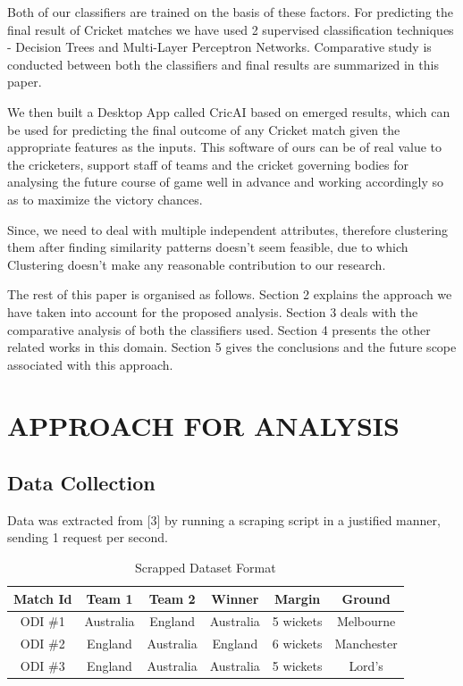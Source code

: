 \documentclass[a4paper, 10pt, conference]{IEEEtran}
\begin{document}
Both of our classifiers are trained on the basis of these factors. For predicting the final result of Cricket matches we have used 2 supervised classification techniques - Decision Trees and Multi-Layer Perceptron Networks. Comparative study is conducted between both the classifiers and final results are summarized in this paper. 

We then built a Desktop App called CricAI based on emerged results, which can be used for predicting the final outcome of any Cricket match given the appropriate features as the inputs. This software of ours can be of real value to the cricketers, support staff of teams and the cricket governing bodies for analysing the future course of game well in advance and working accordingly so as to maximize the victory chances.

Since, we need to deal with multiple independent attributes, therefore clustering them after finding similarity patterns doesn't seem feasible, due to which Clustering doesn't make any reasonable contribution to our research. 

The rest of this paper is organised as follows. Section 2 explains the approach we have taken into account for the proposed analysis. Section 3 deals with the comparative analysis of both the classifiers used. Section 4 presents the other related works in this domain. Section 5 gives the conclusions and the future scope associated with this approach.


\section{APPROACH FOR ANALYSIS}

\subsection{Data Collection}

Data was extracted from [3] by running a scraping script in a justified manner, sending 1 request per second.
\begin{table}[h!]
  \begin{center}
    \caption{Scrapped Dataset Format}
    \label{tab:table1}
    \begin{tabular}{cccccc} 
      \textbf{Match Id} & \textbf{Team 1} & \textbf{Team 2} & \textbf{Winner} & \textbf{Margin} & \textbf{Ground}\\
      \hline
      ODI \#1 & Australia & England & Australia & 5 wickets & Melbourne\\
      ODI \#2 & England & Australia & England & 6 wickets & Manchester\\
      ODI \#3 & England & Australia & Australia & 5 wickets & Lord's\\
    \end{tabular}
  \end{center}
\end{table}
\end{document}

